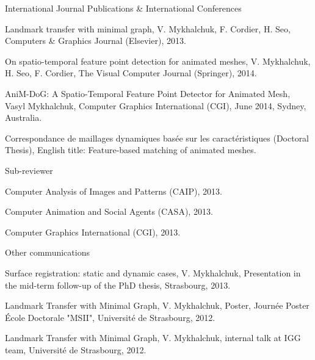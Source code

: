 
\begin{cventries}
  \cventry
    {} %
    {International Journal Publications \& International Conferences} %
    { } %
    { } %
    {
      \begin{cvitems} %
        \item {Landmark transfer with minimal graph, V. Mykhalchuk, F. Cordier, H. Seo, Computers \& Graphics Journal (Elsevier), 2013.}
        \item {On spatio-temporal feature point detection for animated meshes, V. Mykhalchuk, H. Seo, F. Cordier, The Visual Computer Journal (Springer), 2014.}
        \item {AniM-DoG: A Spatio-Temporal Feature Point Detector for Animated Mesh, Vasyl Mykhalchuk, Computer Graphics International (CGI), June 2014, Sydney, Australia.}
        \item {Correspondance de maillages dynamiques basée sur les caractéristiques (Doctoral Thesis), English title: Feature-based matching of animated meshes.}
      \vspace{-5.0mm}
      \end{cvitems}
    }
   
   \cventry
   {}
   {\vspace{-7.0mm}Sub-reviewer}
   {}
   {}
   {
     \begin{cvitems}
     \item{Computer Analysis of Images and Patterns (CAIP), 2013.}
     \item{Computer Animation and Social Agents (CASA), 2013.}
	 \item{Computer Graphics International (CGI), 2013.}
	 \vspace{-5.0mm}
     \end{cvitems}
   } %
   
   \cventry
   {}
   {\vspace{-7.0mm}Other communications}
   {}
   {}
   {
     \begin{cvitems}
     \item Surface registration: static and dynamic cases, V. Mykhalchuk, Presentation in the mid-term  follow-up of the PhD thesis, Strasbourg, 2013. 
\item Landmark Transfer with Minimal Graph, V. Mykhalchuk, Poster, Journée Poster École Doctorale  "MSII", Université de Strasbourg, 2012. 
\item Landmark Transfer with Minimal Graph, V. Mykhalchuk, internal talk at IGG team, Université  de Strasbourg, 2012.
\vspace{-0.0mm}
     \end{cvitems}
   }
   

\end{cventries}
